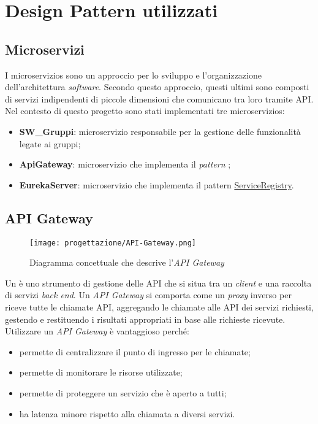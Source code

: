 
\section{Design Pattern utilizzati}
\subsection{Microservizi}
I \glspl{microservizio} sono un approccio per lo sviluppo e l'organizzazione
dell'architettura \textit{software}. Secondo questo approccio, questi ultimi
sono
composti di servizi indipendenti di piccole dimensioni che comunicano tra loro
tramite \gls{API}.\\
Nel contesto di questo progetto sono stati implementati tre
\glspl{microservizio}:
\begin{itemize}
    \item \textbf{SW\_Gruppi}: \gls{microservizio} responsabile per la gestione
          delle funzionalità legate ai gruppi;
    \item \textbf{ApiGateway}: \gls{microservizio} che implementa il
          \textit{pattern} ;
    \item \textbf{EurekaServer}: \gls{microservizio} che implementa il pattern
          \hyperref[sub:ServiceRegistry]{ServiceRegistry}.
          \cite{site-microservizi-aws}
\end{itemize}
\subsection{API Gateway}
\label{sub:ApiGateway}
\begin{figure}[H]
    \centering
    \texttt{[image: progettazione/API-Gateway.png]}
    \caption{Diagramma concettuale che descrive l'\textit{API Gateway}}
\end{figure}
Un  è uno strumento di gestione delle \gls{API} che si situa
tra un \textit{client} e una raccolta di servizi \textit{back end}. Un
\textit{API Gateway} si comporta come un \textit{proxy} inverso per riceve
tutte le chiamate \gls{API}, aggregando le chiamate alle \gls{API} dei servizi
richiesti, gestendo e restituendo i risultati appropriati in base alle
richieste ricevute.\\
Utilizzare un \textit{API Gateway} è vantaggioso perché:
\begin{itemize}
    \item permette di centralizzare il punto di ingresso per le chiamate;
    \item permette di monitorare le risorse utilizzate;
    \item permette di proteggere un servizio che è aperto a tutti;
    \item ha latenza minore rispetto alla chiamata a diversi servizi.
\end{itemize}


